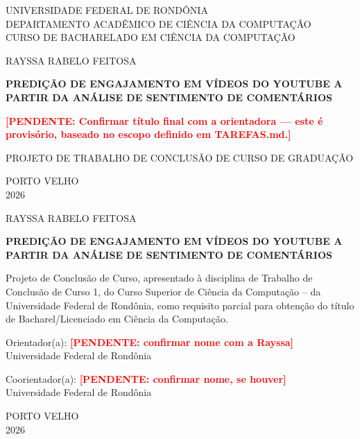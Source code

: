 \documentclass[12pt,a4paper]{article}
\newcommand{\pendente}[1]{\textcolor{red}{\textbf{[PENDENTE: #1]}}}
\begin{document}
\begin{titlepage}
\begin{center}
UNIVERSIDADE FEDERAL DE RONDÔNIA\\
DEPARTAMENTO ACADÊMICO DE CIÊNCIA DA COMPUTAÇÃO\\
CURSO DE BACHARELADO EM CIÊNCIA DA COMPUTAÇÃO

\vspace{4cm}
{\Large RAYSSA RABELO FEITOSA}

\vspace{4cm}
{\bfseries\Large PREDIÇÃO DE ENGAJAMENTO EM VÍDEOS DO YOUTUBE A PARTIR DA ANÁLISE DE SENTIMENTO DE COMENTÁRIOS}

\vspace{0.5cm}
\pendente{Confirmar título final com a orientadora — este é provisório, baseado no escopo definido em TAREFAS.md.}

\vspace{4cm}
PROJETO DE TRABALHO DE CONCLUSÃO DE CURSO DE GRADUAÇÃO

\vfill
PORTO VELHO\\
2026
\end{center}
\end{titlepage}

\begin{titlepage}
\begin{center}
{\Large RAYSSA RABELO FEITOSA}

\vspace{2cm}
{\bfseries\Large PREDIÇÃO DE ENGAJAMENTO EM VÍDEOS DO YOUTUBE A PARTIR DA ANÁLISE DE SENTIMENTO DE COMENTÁRIOS}
\end{center}

\vspace{2cm}
\hfill
\begin{minipage}{0.55\textwidth}
Projeto de Conclusão de Curso, apresentado à disciplina de Trabalho de Conclusão de Curso 1, do Curso Superior de Ciência da Computação -- da Universidade Federal de Rondônia, como requisito parcial para obtenção do título de Bacharel/Licenciado em Ciência da Computação.

\vspace{0.5cm}
Orientador(a): \pendente{confirmar nome com a Rayssa}\\
Universidade Federal de Rondônia

\vspace{0.3cm}
Coorientador(a): \pendente{confirmar nome, se houver}\\
Universidade Federal de Rondônia
\end{minipage}

\vfill
\begin{center}
PORTO VELHO\\
2026
\end{center}
\end{titlepage}
\end{document}
